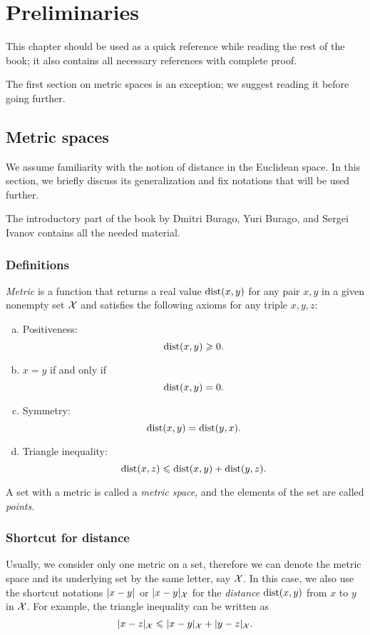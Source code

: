 \chapter*{Preliminaries}

This chapter should be used as a quick reference while reading the rest of the book;
it also contains all necessary references with complete proof.

The first section on metric spaces is an exception;
we suggest reading it before going further.

\section{Metric spaces}\label{sec:metric-spcaes}

We assume familiarity with the notion of distance in the 
Euclidean space.
In this section, we briefly discuss its generalization and fix notations that will be used further.

The introductory part of the book by Dmitri Burago, Yuri Burago, and Sergei Ivanov \cite{burago-burago-ivanov} contains all the needed material.

\subsection*{Definitions}

\emph{Metric} is a function that returns a real value $\mathop{\rm dist}\nolimits(x,y)$ for any pair $x,y$ in a given nonempty set $\mathcal{X}$  and satisfies the following axioms for any triple $x,y,z$: \label{page:def:metric}
\begin{enumerate}[(a)]
\item\label{def:metric-space:a} Positiveness: 
$$\mathop{\rm dist}\nolimits(x,y)\geqslant 0.$$
\item\label{def:metric-space:b} $x=y$ if and only if 
$$\mathop{\rm dist}\nolimits(x,y)=0.$$
\item\label{def:metric-space:c} Symmetry: $$\mathop{\rm dist}\nolimits(x, y) = \mathop{\rm dist}\nolimits(y, x).$$
\item\label{def:metric-space:d} Triangle inequality: 
$$\mathop{\rm dist}\nolimits(x, z) \leqslant \mathop{\rm dist}\nolimits(x, y) + \mathop{\rm dist}\nolimits(y, z).$$
\end{enumerate}

A set with a metric is called a \emph{metric space}, and the elements of the set are called \emph{points}.

\subsection*{Shortcut for distance}
Usually, we consider only one metric on a set, therefore we can denote the metric space and its underlying set by the same letter, say $\mathcal{X}$.
In this case, we also use the shortcut notations $\dist{x}{y}{}$ or $\dist{x}{y}{\spc{X}}$  for the {}\emph{distance} $\mathop{\rm dist}\nolimits(x,y)$ from $x$ to $y$ in $\mathcal{X}$.
For example, the triangle inequality can be written as 
$$\dist{x}{z}{\spc{X}}\le \dist{x}{y}{\spc{X}}+\dist{y}{z}{\spc{X}}.$$

